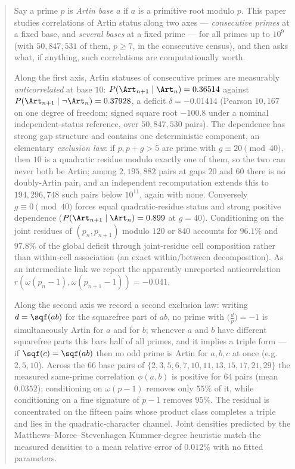 \begin{abstract}
	Say a prime $p$ is \emph{Artin base $a$} if $a$ is a primitive root modulo $p$.
	This paper studies correlations of Artin status along two axes --- \emph{consecutive
	primes} at a fixed base, and \emph{several bases} at a fixed prime --- for all primes up to $10^9$ (with $50{,}847{,}531$ of them, $p\ge 7$, in the
	consecutive census), and then asks what, if anything, such correlations are
	computationally worth.

	Along the first axis, Artin statuses of consecutive primes are measurably
	\emph{anticorrelated} at base $10$: $P(\Art_{n+1}\mid\Art_n)=0.36514$ against
	$P(\Art_{n+1}\mid\lnot\Art_n)=0.37928$, a deficit $\delta=-0.01414$
	(Pearson $10{,}167$ on one degree of freedom; signed square root $-100.8$ under a
	nominal independent-status reference, over $50{,}847{,}530$ pairs). The dependence
	has strong gap structure and contains one deterministic component, an elementary
	\emph{exclusion law}: if $p,p+g>5$ are prime with $g\equiv 20 \pmod{40}$, then $10$
	is a quadratic residue modulo exactly one of them, so the two can never both be
	Artin; among $2{,}195{,}882$ pairs at gaps $20$ and $60$ there is no doubly-Artin
	pair, and an independent recomputation extends this to $194{,}296{,}748$ such pairs
	below $10^{11}$, again with none. Conversely $g \equiv 0 \pmod{40}$ forces equal
	quadratic-residue status and strong positive dependence ($P(\Art_{n+1}\mid\Art_n)=0.899$
	at $g=40$). Conditioning on the joint residues of $(p_n,p_{n+1})$ modulo $120$ or
	$840$ accounts for $96.1\%$ and $97.8\%$ of the global deficit through joint-residue cell
	composition rather than within-cell association (an exact within/between decomposition). As an intermediate link we report the apparently unreported
	anticorrelation $r(\omega(p_n-1),\omega(p_{n+1}-1))=-0.041$.

	Along the second axis we record a second exclusion law: writing $d=\sqf(ab)$ for the
	squarefree part of $ab$, no prime with $\bigl(\tfrac{d}{p}\bigr)=-1$ is simultaneously
	Artin for $a$ and for $b$; whenever $a$ and $b$ have different squarefree parts this
	bars half of all primes, and it implies a triple form --- if $\sqf(c)=\sqf(ab)$ then no
	odd prime is Artin for $a,b,c$ at once (e.g.\ $2,5,10$). Across the $66$ base pairs of
	$\{2,3,5,6,7,10,11,13,15,17,21,29\}$ the measured same-prime correlation $\phi(a,b)$ is
	positive for $64$ pairs (mean $0.0352$); conditioning on $\omega(p-1)$ removes only
	$55\%$ of it, while conditioning on a fine signature of $p-1$ removes $95\%$. The
	residual is concentrated on the fifteen pairs whose product class completes a triple
	and lies in the quadratic-character channel. Joint densities predicted by the
	Matthews--Moree--Stevenhagen Kummer-degree heuristic match the measured densities to a
	mean relative error of $0.012\%$ with no fitted parameters.


\end{abstract}
